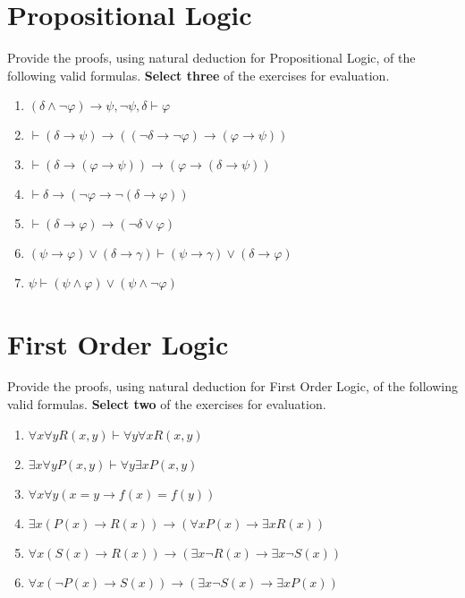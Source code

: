 \documentclass[11pt]{article}
\begin{document}
\section{Propositional Logic}

\begin{myExercise}
  Provide the proofs, using natural deduction for Propositional Logic, of the following valid formulas. \textbf{Select three} of the exercises for evaluation.
  
  \begin{enumerate}[label=(\alph*)]
    \item $(\delta \land \neg\varphi) \to \psi, \neg\psi, \delta \vdash \varphi$
    \item $\vdash (\delta \to \psi) \to ((\neg\delta \to \neg\varphi) \to (\varphi \to \psi))$
    \item $\vdash (\delta \to (\varphi \to \psi)) \to (\varphi \to (\delta \to \psi))$
    \item $\vdash \delta \to (\neg\varphi \to \neg(\delta \to \varphi))$
    \item $\vdash (\delta \to \varphi) \to (\neg\delta \lor \varphi)$
    \item $(\psi \to \varphi) \lor (\delta \to \gamma) \vdash (\psi \to \gamma) \lor (\delta \to \varphi)$
    \item $\psi \vdash (\psi \land \varphi) \lor (\psi \land \neg\varphi)$

  \end{enumerate}

\end{myExercise}

\section{First Order Logic}

\begin{myExercise}
 Provide the proofs, using natural deduction for First Order Logic, of the following valid formulas. \textbf{Select two} of the exercises for evaluation.
  
  \begin{enumerate}[label=(\alph*)]
    \item $\forall x \forall y R(x,y) \vdash \forall y\forall x R(x,y)$
    \item $\exists x\forall y P(x,y) \vdash \forall y\exists x P(x,y)$
    \item $\forall x\forall y (x = y \to f(x) = f(y))$
    \item $\exists x (P(x) \to R(x)) \to (\forall x P(x) \to \exists x R(x))$
    \item $\forall x(S(x) \to R(x)) \to (\exists x\neg R(x) \to \exists x\neg S(x))$
    \item $\forall x (\neg P(x) \to S(x)) \to (\exists x \neg S(x) \to \exists x P(x))$

  \end{enumerate}

\end{myExercise}
 
\end{document}
